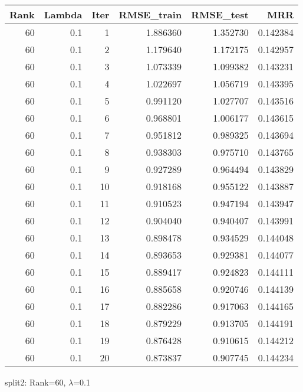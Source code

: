 \begin{tabular}{rrrrrr}
\toprule
 Rank &  Lambda &  Iter &  RMSE\_train &  RMSE\_test &       MRR \\
\midrule
   60 &     0.1 &     1 &    1.886360 &   1.352730 &  0.142384 \\
   60 &     0.1 &     2 &    1.179640 &   1.172175 &  0.142957 \\
   60 &     0.1 &     3 &    1.073339 &   1.099382 &  0.143231 \\
   60 &     0.1 &     4 &    1.022697 &   1.056719 &  0.143395 \\
   60 &     0.1 &     5 &    0.991120 &   1.027707 &  0.143516 \\
   60 &     0.1 &     6 &    0.968801 &   1.006177 &  0.143615 \\
   60 &     0.1 &     7 &    0.951812 &   0.989325 &  0.143694 \\
   60 &     0.1 &     8 &    0.938303 &   0.975710 &  0.143765 \\
   60 &     0.1 &     9 &    0.927289 &   0.964494 &  0.143829 \\
   60 &     0.1 &    10 &    0.918168 &   0.955122 &  0.143887 \\
   60 &     0.1 &    11 &    0.910523 &   0.947194 &  0.143947 \\
   60 &     0.1 &    12 &    0.904040 &   0.940407 &  0.143991 \\
   60 &     0.1 &    13 &    0.898478 &   0.934529 &  0.144048 \\
   60 &     0.1 &    14 &    0.893653 &   0.929381 &  0.144077 \\
   60 &     0.1 &    15 &    0.889417 &   0.924823 &  0.144111 \\
   60 &     0.1 &    16 &    0.885658 &   0.920746 &  0.144139 \\
   60 &     0.1 &    17 &    0.882286 &   0.917063 &  0.144165 \\
   60 &     0.1 &    18 &    0.879229 &   0.913705 &  0.144191 \\
   60 &     0.1 &    19 &    0.876428 &   0.910615 &  0.144212 \\
   60 &     0.1 &    20 &    0.873837 &   0.907745 &  0.144234 \\
\bottomrule
\end{tabular}

\caption{split2: Rank=60, $\lambda$=0.1}
